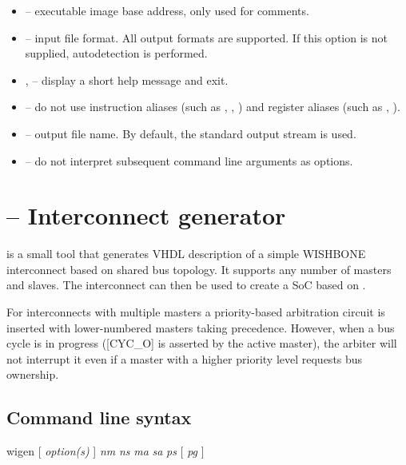 \documentclass[a4paper,12pt,twoside,extrafontsizes]{memoir}
\begin{document}
\begin{itemize}
	\item {} -- executable image base address, only used for comments.
	
	\item {} -- input file format. All  output formats are supported. If this option is not supplied, autodetection is performed.
	
	\item {},  -- display a short help message and exit.
	
	\item {} -- do not use instruction aliases (such as , , ) and register aliases (such as , ).
	
	\item {} -- output file name. By default, the standard output stream is used.
	
	\item \shellcmd{--} -- do not interpret subsequent command line arguments as options.
\end{itemize}

\section{ -- Interconnect generator}

 is a small tool that generates VHDL description of a simple WISHBONE interconnect based on shared bus topology. It supports any number of masters and slaves. The interconnect can then be used to create a SoC based on \lxp{}.

For interconnects with multiple masters a priority-based arbitration circuit is inserted with lower-numbered masters taking precedence. However, when a bus cycle is in progress ([CYC\_O] is asserted by the active master), the arbiter will not interrupt it even if a master with a higher priority level requests bus ownership.

\subsection{Command line syntax}

\begin{codepar}
	wigen [ \emph{option(s)} ] \emph{nm} \emph{ns} \emph{ma} \emph{sa} \emph{ps} [ \emph{pg} ]
\end{codepar}
\end{document}

